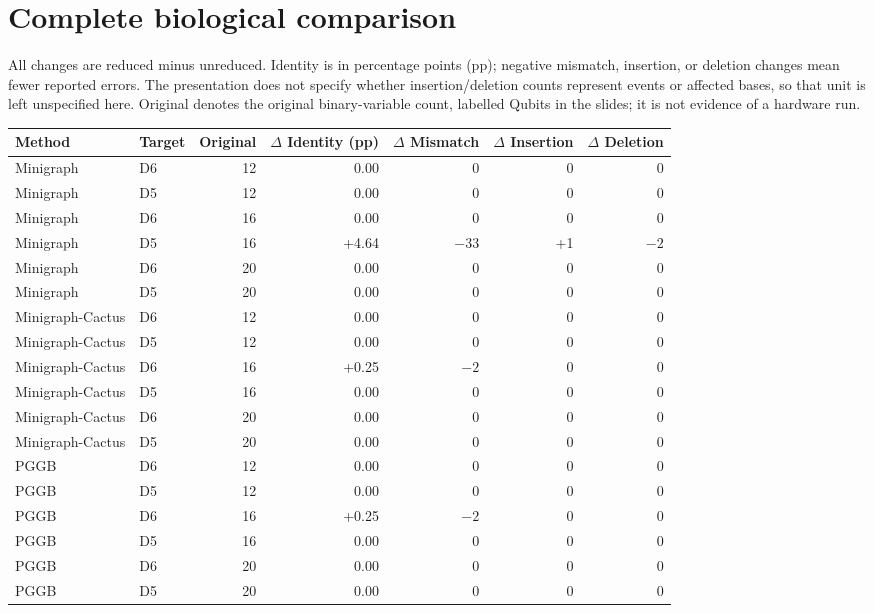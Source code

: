 \documentclass[10pt,letterpaper]{article}
\begin{document}
\section*{Complete biological comparison}
All changes are reduced minus unreduced. Identity is in percentage points
(pp); negative mismatch, insertion, or deletion changes mean fewer reported
errors. The presentation does not specify whether insertion/deletion counts
represent events or affected bases, so that unit is left unspecified here.
Original denotes the original binary-variable count, labelled Qubits
in the slides; it is not evidence of a hardware run.
\begin{center}
\small
\setlength{\tabcolsep}{5pt}
\begin{tabular}{llrrrrr}
\toprule
Method & Target & Original & $\Delta$ Identity (pp) & $\Delta$ Mismatch & $\Delta$ Insertion & $\Delta$ Deletion\\
\midrule
Minigraph & D6 & 12 & 0.00 & 0 & 0 & 0\\
Minigraph & D5 & 12 & 0.00 & 0 & 0 & 0\\
Minigraph & D6 & 16 & 0.00 & 0 & 0 & 0\\
Minigraph & D5 & 16 & +4.64 & $-33$ & +1 & $-2$\\
Minigraph & D6 & 20 & 0.00 & 0 & 0 & 0\\
Minigraph & D5 & 20 & 0.00 & 0 & 0 & 0\\
\midrule
Minigraph-Cactus & D6 & 12 & 0.00 & 0 & 0 & 0\\
Minigraph-Cactus & D5 & 12 & 0.00 & 0 & 0 & 0\\
Minigraph-Cactus & D6 & 16 & +0.25 & $-2$ & 0 & 0\\
Minigraph-Cactus & D5 & 16 & 0.00 & 0 & 0 & 0\\
Minigraph-Cactus & D6 & 20 & 0.00 & 0 & 0 & 0\\
Minigraph-Cactus & D5 & 20 & 0.00 & 0 & 0 & 0\\
\midrule
PGGB & D6 & 12 & 0.00 & 0 & 0 & 0\\
PGGB & D5 & 12 & 0.00 & 0 & 0 & 0\\
PGGB & D6 & 16 & +0.25 & $-2$ & 0 & 0\\
PGGB & D5 & 16 & 0.00 & 0 & 0 & 0\\
PGGB & D6 & 20 & 0.00 & 0 & 0 & 0\\
PGGB & D5 & 20 & 0.00 & 0 & 0 & 0\\
\bottomrule
\end{tabular}
\end{center}
\end{document}
